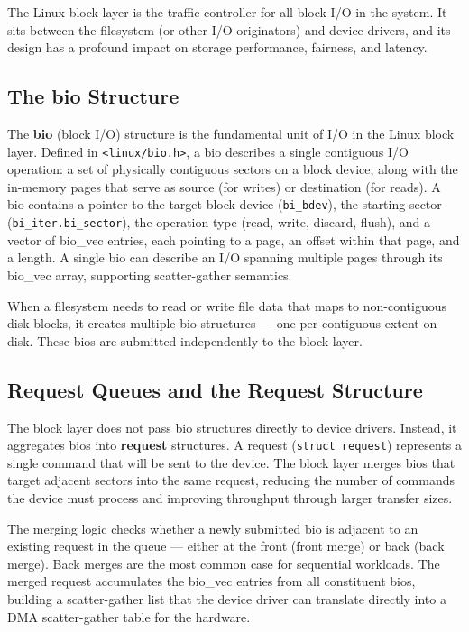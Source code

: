 The Linux block layer is the traffic controller for all block I/O in the system. It sits between the filesystem (or other I/O originators) and device drivers, and its design has a profound impact on storage performance, fairness, and latency.

\subsection{The bio Structure}

The \textbf{bio} (block I/O) structure is the fundamental unit of I/O in the Linux block layer. Defined in \texttt{<linux/bio.h>}, a bio describes a single contiguous I/O operation: a set of physically contiguous sectors on a block device, along with the in-memory pages that serve as source (for writes) or destination (for reads). A bio contains a pointer to the target block device (\texttt{bi\_bdev}), the starting sector (\texttt{bi\_iter.bi\_sector}), the operation type (read, write, discard, flush), and a vector of bio\_vec entries, each pointing to a page, an offset within that page, and a length. A single bio can describe an I/O spanning multiple pages through its bio\_vec array, supporting scatter-gather semantics.

When a filesystem needs to read or write file data that maps to non-contiguous disk blocks, it creates multiple bio structures --- one per contiguous extent on disk. These bios are submitted independently to the block layer.

\subsection{Request Queues and the Request Structure}

The block layer does not pass bio structures directly to device drivers. Instead, it aggregates bios into \textbf{request} structures. A request (\texttt{struct request}) represents a single command that will be sent to the device. The block layer merges bios that target adjacent sectors into the same request, reducing the number of commands the device must process and improving throughput through larger transfer sizes.

The merging logic checks whether a newly submitted bio is adjacent to an existing request in the queue --- either at the front (front merge) or back (back merge). Back merges are the most common case for sequential workloads. The merged request accumulates the bio\_vec entries from all constituent bios, building a scatter-gather list that the device driver can translate directly into a DMA scatter-gather table for the hardware.

